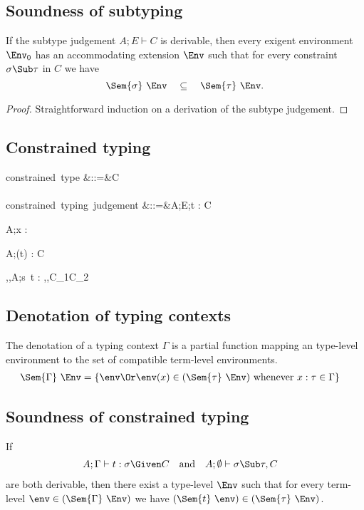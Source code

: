\documentclass{amsart}
\theoremstyle{definition}
\begin{document}
\subsection{Soundness of subtyping}
\label{subsound}
If the subtype judgement $A;E\vdash C$ is derivable, then every
exigent environment $\Env_0$ has an accommodating extension
$\Env$ such that for every constraint $\sigma\Sub\tau$ in $C$ we
have
\[
\Sem{\sigma}~\Env \quad \subseteq \quad \Sem{\tau}~\Env.
\]

\begin{proof}
Straightforward induction on a derivation of the subtype judgement.
\end{proof}

\subsection{Constrained typing}
\begin{syntax}
\mbox{constrained type}
&::=&\tau \Given C
\\\\
\mbox{constrained typing judgement}
&::=&A;E;\Gamma \vdash t : \tau \Given C
\end{syntax}

{A;\Gamma\vdash x : \tau \Given \emptyset}

{A;\Gamma\vdash (t) : \sigma\R\tau \Given C}

{\alpha,\beta,A;\Gamma\vdash s~t : \beta \Given
\sigma\Sub\alpha\R\beta,\tau\Sub\alpha,C_1\cup C_2}

\subsection{Denotation of typing contexts}
The denotation of a typing context $\Gamma$ is a partial function
mapping an type-level environment to the set of compatible
term-level environments.
\begin{align*}
\Sem{\Gamma}~\Env&=
\left\{\env \Or
\env(x)\in(\Sem{\tau}~\Env)\text{ whenever }x:\tau\in\Gamma
\right\}
\end{align*}

\subsection{Soundness of constrained typing}
\label{consound}
If
\begin{align*}
A;\Gamma&\vdash t : \sigma\Given C&
&\text{and}&
A;\emptyset&\vdash\sigma\Sub\tau,C
\end{align*}
are both derivable, then there exist a type-level $\Env$ such
that for every term-level $\env\in(\Sem{\Gamma}~\Env)$ we have
$(\Sem{t}~\env)\in(\Sem{\tau}~\Env)$.
\end{document}
